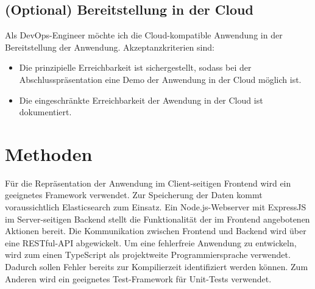 \documentclass[a4paper, 10pt, conference]{ieeeconf}
\begin{document}
\subsection{(Optional) Bereitstellung in der Cloud}

Als DevOps-Engineer möchte ich die Cloud-kompatible Anwendung in der  Bereitstellung der Anwendung.  Akzeptanzkriterien sind:
\begin{itemize}
\item Die prinzipielle Erreichbarkeit ist sichergestellt,  sodass bei der Abschlusspräsentation eine Demo der Anwendung in der Cloud möglich ist.
\item Die eingeschränkte Erreichbarkeit der Awendung in der Cloud ist dokumentiert.
\end{itemize}


\section{Methoden} \label{s:methoden}

Für die Repräsentation der Anwendung im Client-seitigen Frontend wird ein geeignetes Framework verwendet.  Zur Speicherung der Daten kommt voraussichtlich Elasticsearch zum Einsatz. Ein Node.js-Webserver mit ExpressJS im Server-seitigen Backend stellt die Funktionalität der im Frontend angebotenen Aktionen bereit.  Die Kommunikation zwischen Frontend und Backend wird über eine RESTful-API abgewickelt. Um eine fehlerfreie Anwendung zu entwickeln, wird zum einen TypeScript als projektweite Programmiersprache verwendet. Dadurch sollen Fehler bereits zur Kompilierzeit identifiziert werden können. Zum Anderen wird ein geeignetes Test-Framework für Unit-Tests verwendet.

\printbibliography
\end{document}
